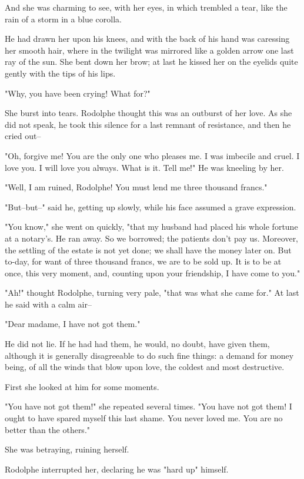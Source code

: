 \documentclass[11pt,twocolumn]{ltugboat}
\begin{document}
And she was charming to see, with her eyes, in which trembled a tear,
like the rain of a storm in a blue corolla.

He had drawn her upon his knees, and with the back of his hand was
caressing her smooth hair, where in the twilight was mirrored like a
golden arrow one last ray of the sun. She bent down her brow; at last he
kissed her on the eyelids quite gently with the tips of his lips.

"Why, you have been crying! What for?"

She burst into tears. Rodolphe thought this was an outburst of her
love. As she did not speak, he took this silence for a last remnant of
resistance, and then he cried out--

"Oh, forgive me! You are the only one who pleases me. I was imbecile and
cruel. I love you. I will love you always. What is it. Tell me!" He was
kneeling by her.

"Well, I am ruined, Rodolphe! You must lend me three thousand francs."

"But--but--" said he, getting up slowly, while his face assumed a grave
expression.

"You know," she went on quickly, "that my husband had placed his whole
fortune at a notary's. He ran away. So we borrowed; the patients don't
pay us. Moreover, the settling of the estate is not yet done; we shall
have the money later on. But to-day, for want of three thousand francs,
we are to be sold up. It is to be at once, this very moment, and,
counting upon your friendship, I have come to you."

"Ah!" thought Rodolphe, turning very pale, "that was what she came for."
At last he said with a calm air--

"Dear madame, I have not got them."

He did not lie. If he had had them, he would, no doubt, have given them,
although it is generally disagreeable to do such fine things: a demand
for money being, of all the winds that blow upon love, the coldest and
most destructive.

First she looked at him for some moments.

"You have not got them!" she repeated several times. "You have not got
them! I ought to have spared myself this last shame. You never loved me.
You are no better than the others."

She was betraying, ruining herself.

Rodolphe interrupted her, declaring he was "hard up" himself.
\end{document}
